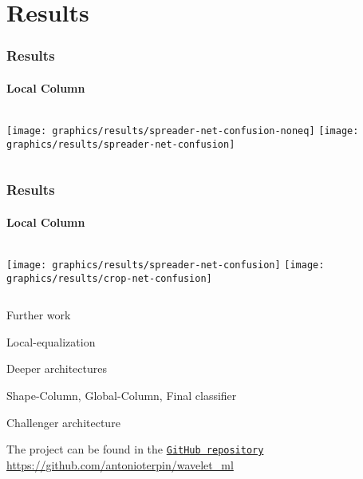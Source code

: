 \section{Results}
    \begin{frame}
        \frametitle{Results}
        \framesubtitle{Local Column}
        \centering
        \begin{columns}
                 {
                    \texttt{[image: graphics/results/spreader-net-confusion-noneq]}
                }
                 {
                    \texttt{[image: graphics/results/spreader-net-confusion]}
                }
        \end{columns}
    \end{frame}

    \begin{frame}
        \frametitle{Results}
        \framesubtitle{Local Column}
        \centering
        \begin{columns}
                 {
                    \texttt{[image: graphics/results/spreader-net-confusion]}
                }
                 {
                    \texttt{[image: graphics/results/crop-net-confusion]}
                }
        \end{columns}
    \end{frame}

    \begin{frame}{Further work}
        \centering
        \begin{description}
            \item <1->[1.] Local-equalization
            \item <2->[2.] Deeper architectures 
            \item <3->[3.] Shape-Column, Global-Column, Final classifier
            \item <4->[4.] Challenger architecture
        \end{description}
        \vskip 1.5cm
         {
            The project can be found in the \href{https://github.com/antonioterpin/wavelet_ml}{\texttt{GitHub repository}}
            \vskip 0.5cm
            \url{https://github.com/antonioterpin/wavelet_ml}
        }
    \end{frame}